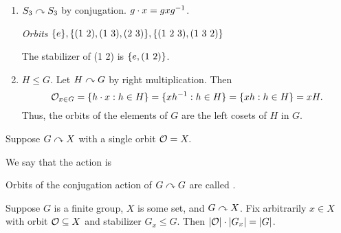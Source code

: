 \documentclass[notes.tex]{subfiles}
\begin{document}
\begin{eg}
\begin{enumerate}
\begin{proof}
				Thus, $gx\inv x = x\inv x$ (as $X = G$), so $g = e_G$.
			\end{proof}
		\item
			$S_3\curvearrowright S_3$ by conjugation. $g\cdot x = gx{g}^{-1}$.

			\emph{Orbits} $\{e\}, \{\text{(1 2)}, \text{(1 3)}, \text{(2 3)}\}, \{\text{(1 2 3)}, \text{(1 3 2)}\}$

			The stabilizer of (1 2) is $\{e, \text{(1 2)}\}$.
		\item
			$H\le G$. Let $H\curvearrowright G$ by right multiplication.
			Then
			$$\mathcal{O}_{x\in G} = \{h\cdot x : h\in H\} = \{x{h}^{-1}: h\in H\} = \{xh : h\in H\} = xH.$$
			Thus, the orbits of the elements of $G$ are the left cosets of $H$ in $G$.
	\end{enumerate}
\end{eg}

\begin{defn}
	Suppose $G\curvearrowright X$ with a single orbit $\mathcal{O} = X.$

	We say that the action is 
\end{defn}

\begin{defn}
	Orbits of the conjugation action of $G\curvearrowright G$ are called .
\end{defn}

\begin{theorem}
  \label{OST}
	Suppose $G$ is a finite group, $X$ is some set, and $G\curvearrowright X$. Fix arbitrarily $x\in X$ with orbit $\mathcal{O} \subseteq X$ and stabilizer $G_x \le G.$ Then $|\mathcal{O}|\cdot|G_x| = |G|$.
\end{theorem}
\end{document}
